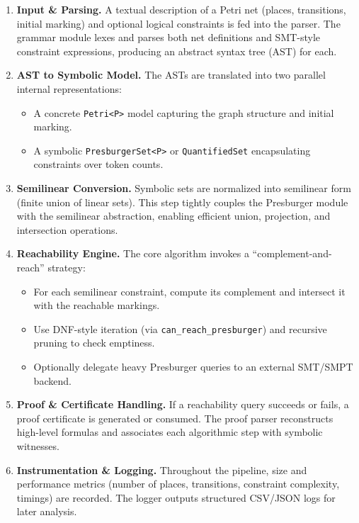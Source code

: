 \begin{enumerate}
	\item \textbf{Input \& Parsing.} A textual description of a Petri net (places, transitions, initial marking) and optional logical constraints is fed into the parser. The grammar module lexes and parses both net definitions and SMT-style constraint expressions, producing an abstract syntax tree (AST) for each.
	
	\item \textbf{AST to Symbolic Model.} The ASTs are translated into two parallel internal representations:
	\begin{itemize}
		\item A concrete \texttt{Petri<P>} model capturing the graph structure and initial marking.
		\item A symbolic \texttt{PresburgerSet<P>} or \texttt{QuantifiedSet} encapsulating constraints over token counts.
	\end{itemize}
	
	\item \textbf{Semilinear Conversion.} Symbolic sets are normalized into semilinear form (finite union of linear sets). This step tightly couples the Presburger module with the semilinear abstraction, enabling efficient union, projection, and intersection operations.
	
	\item \textbf{Reachability Engine.} The core algorithm invokes a “complement-and-reach” strategy:
	\begin{itemize}
		\item For each semilinear constraint, compute its complement and intersect it with the reachable markings.
		\item Use DNF-style iteration (via \texttt{can\_reach\_presburger}) and recursive pruning to check emptiness.
		\item Optionally delegate heavy Presburger queries to an external SMT/SMPT backend.
	\end{itemize}
	
	\item \textbf{Proof \& Certificate Handling.} If a reachability query succeeds or fails, a proof certificate is generated or consumed. The proof parser reconstructs high-level formulas and associates each algorithmic step with symbolic witnesses.
	
	\item \textbf{Instrumentation \& Logging.} Throughout the pipeline, size and performance metrics (number of places, transitions, constraint complexity, timings) are recorded. The logger outputs structured CSV/JSON logs for later analysis.
	

\end{enumerate}
